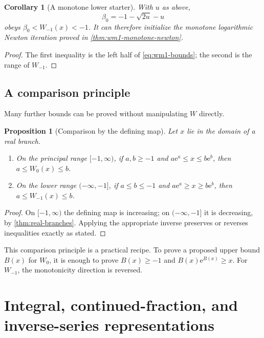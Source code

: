 \documentclass[11pt]{article}
\numberwithin{equation}{section}
\newtheorem{proposition}[theorem]{Proposition}
\newtheorem{corollary}[theorem]{Corollary}
\theoremstyle{definition}
\theoremstyle{remark}
\newcommand{\e}{\mathrm e}
\begin{document}
\begin{corollary}[A monotone lower starter]
\label{cor:wm1-lower-starter}
With $u$ as above,
\begin{equation}
  \beta_0=-1-\sqrt{2u}-u                              \label{eq:wm1-starter}
\end{equation}
obeys $\beta_0<W_{-1}(x)<-1$.  It can therefore initialize the monotone
logarithmic Newton iteration proved in \cref{thm:wm1-monotone-newton}.
\end{corollary}

\begin{proof}
The first inequality is the left half of \eqref{eq:wm1-bounds}; the second is
the range of $W_{-1}$.
\end{proof}

\subsection{A comparison principle}

Many further bounds can be proved without manipulating $W$ directly.

\begin{proposition}[Comparison by the defining map]
\label{prop:comparison}
Let $x$ lie in the domain of a real branch.
\begin{enumerate}[label=\textup{(\roman*)}]
\item On the principal range $[-1,\infty)$, if $a,b\ge-1$ and
      $a\e^a\le x\le b\e^b$, then
      $a\le W_0(x)\le b$.
\item On the lower range $(-\infty,-1]$, if $a\le b\le-1$ and
      $a\e^a\ge x\ge b\e^b$, then
      $a\le W_{-1}(x)\le b$.
\end{enumerate}
\end{proposition}

\begin{proof}
On $[-1,\infty)$ the defining map is increasing; on
$(-\infty,-1]$ it is decreasing, by \cref{thm:real-branches}.  Applying the
appropriate inverse preserves or reverses inequalities exactly as stated.
\end{proof}

This comparison principle is a practical recipe.  To prove a proposed upper
bound $B(x)$ for $W_0$, it is enough to prove $B(x)\ge-1$ and
$B(x)\e^{B(x)}\ge x$.  For $W_{-1}$, the monotonicity direction is reversed.

\section{Integral, continued-fraction, and inverse-series representations}
\label{sec:representations}
\end{document}

